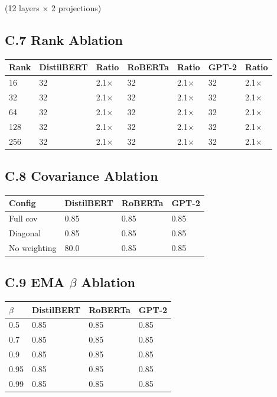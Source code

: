 (12 layers $\times$ 2 projections)

\subsection{C.7 Rank Ablation}

\begin{table}[H]
\centering
\small
\begin{tabular}{lllllll}
\toprule
\textbf{Rank} & \textbf{DistilBERT} & \textbf{Ratio} & \textbf{RoBERTa} & \textbf{Ratio} & \textbf{GPT-2} & \textbf{Ratio} \\
\midrule
16 & 32 & 2.1$\times$ & 32 & 2.1$\times$ & 32 & 2.1$\times$ \\
32 & 32 & 2.1$\times$ & 32 & 2.1$\times$ & 32 & 2.1$\times$ \\
64 & 32 & 2.1$\times$ & 32 & 2.1$\times$ & 32 & 2.1$\times$ \\
128 & 32 & 2.1$\times$ & 32 & 2.1$\times$ & 32 & 2.1$\times$ \\
256 & 32 & 2.1$\times$ & 32 & 2.1$\times$ & 32 & 2.1$\times$ \\
\bottomrule
\end{tabular}
\end{table}

\subsection{C.8 Covariance Ablation}

\begin{table}[H]
\centering
\small
\begin{tabular}{llll}
\toprule
\textbf{Config} & \textbf{DistilBERT} & \textbf{RoBERTa} & \textbf{GPT-2} \\
\midrule
Full cov & 0.85 & 0.85 & 0.85 \\
Diagonal & 0.85 & 0.85 & 0.85 \\
No weighting & 80.0 & 0.85 & 0.85 \\
\bottomrule
\end{tabular}
\end{table}

\subsection{C.9 EMA $\beta$ Ablation}

\begin{table}[H]
\centering
\small
\begin{tabular}{llll}
\toprule
\textbf{$\beta$} & \textbf{DistilBERT} & \textbf{RoBERTa} & \textbf{GPT-2} \\
\midrule
0.5 & 0.85 & 0.85 & 0.85 \\
0.7 & 0.85 & 0.85 & 0.85 \\
0.9 & 0.85 & 0.85 & 0.85 \\
0.95 & 0.85 & 0.85 & 0.85 \\
0.99 & 0.85 & 0.85 & 0.85 \\
\bottomrule
\end{tabular}
\end{table}

